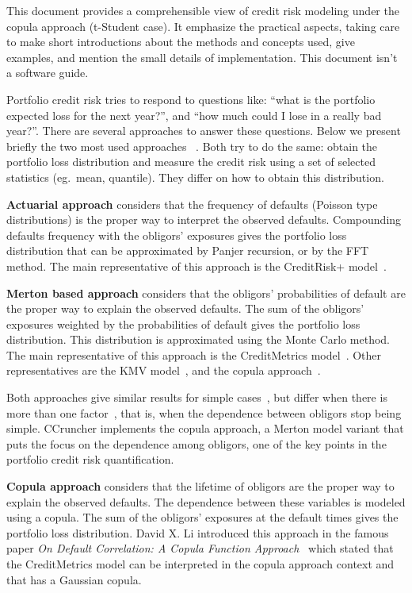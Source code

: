 \documentclass[11pt,fleqn]{book} %
\begin{document}
This document provides a comprehensible view of credit risk modeling under the
copula approach (t-Student case). It emphasize the practical aspects, taking 
care to make short introductions about the methods and concepts used, give 
examples, and mention the small details of implementation. This document isn't 
a software guide.

Portfolio credit risk tries to respond to questions like: \enquote{what is the 
portfolio expected loss for the next year?}, and \enquote{how much could I 
lose in a really bad year?}. There are several approaches to answer these 
questions. Below we present briefly the two most used approaches~\cite{crouhy:2000} 
\cite[chap. 2.4]{bluhm:2002}. Both try to do the same: obtain the portfolio 
loss distribution and measure the credit risk using a set of selected 
statistics (eg.\ mean, quantile). They differ on how to obtain this 
distribution. 

\textbf{Actuarial approach} considers that the frequency 
of defaults (Poisson type distributions) is the proper way to interpret the 
observed defaults. Compounding defaults frequency with the obligors' exposures 
gives the portfolio loss distribution that can be approximated by Panjer 
recursion, or by the FFT method. The main representative of this approach is 
the CreditRisk+ model~\cite{creditrisk+:1997}.

\textbf{Merton based approach} considers that the obligors' 
probabilities of default are the proper way to explain the observed defaults.
The sum of the obligors' exposures weighted by the probabilities of default 
gives the portfolio loss distribution. This distribution is approximated 
using the Monte Carlo method. The main representative of this approach is the 
CreditMetrics\texttrademark{} model~\cite{cmetrics:1997}. Other representatives 
are the KMV model~\cite{kmv:2003}, and the copula approach~\cite{li:2000}. 

Both approaches give similar results for simple cases~\cite{koyluoglu:1998},
but differ when there is more than one factor~\cite{bluhm:2001}, that is, 
when the dependence between obligors stop being simple.
CCruncher implements the copula approach, a Merton model variant that puts 
the focus on the dependence among obligors, one of the key points in the 
portfolio credit risk quantification.

\textbf{Copula approach} considers that the lifetime of obligors
are the proper way to explain the observed defaults. The dependence between 
these variables is modeled using a copula. The sum of the obligors' exposures 
at the default times gives the portfolio loss distribution.
David X. Li introduced this approach in the famous paper
\emph{On Default Correlation: A Copula Function Approach}~\cite{li:2000}
which stated that the CreditMetrics\texttrademark{} model can be interpreted 
in the copula approach context and that has a Gaussian copula.
\end{document}
